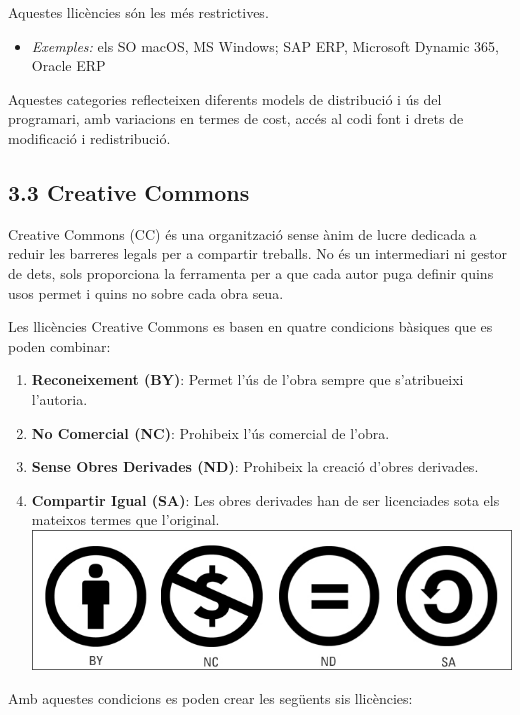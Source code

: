 \documentclass[
  12 pt,
  a4paper,
]{article}
\providecommand{\tightlist}{%
  \setlength{\itemsep}{0pt}\setlength{\parskip}{0pt}}
\begin{document}
Aquestes llicències són les més restrictives.

\begin{itemize}
\tightlist
\item
  \emph{Exemples:} els SO macOS, MS Windows; SAP ERP, Microsoft Dynamic
  365, Oracle ERP
\end{itemize}

Aquestes categories reflecteixen diferents models de distribució i ús
del programari, amb variacions en termes de cost, accés al codi font i
drets de modificació i redistribució.

\subsection{3.3 Creative Commons}\label{creative-commons}

Creative Commons (CC) és una organització sense ànim de lucre dedicada a
reduir les barreres legals per a compartir treballs. No és un
intermediari ni gestor de dets, sols proporciona la ferramenta per a que
cada autor puga definir quins usos permet i quins no sobre cada obra
seua.

Les llicències Creative Commons es basen en quatre condicions bàsiques
que es poden combinar:

\begin{enumerate}
\def\labelenumi{\arabic{enumi}.}
\tightlist
\item
  \textbf{Reconeixement (BY)}: Permet l'ús de l'obra sempre que
  s'atribueixi l'autoria.
\item
  \textbf{No Comercial (NC)}: Prohibeix l'ús comercial de l'obra.
\item
  \textbf{Sense Obres Derivades (ND)}: Prohibeix la creació d'obres
  derivades.
\item
  \textbf{Compartir Igual (SA)}: Les obres derivades han de ser
  licenciades sota els mateixos termes que
  l'original.\includegraphics{recursos/cc-icons.jpg}
\end{enumerate}

Amb aquestes condicions es poden crear les següents sis llicències:
\end{document}
